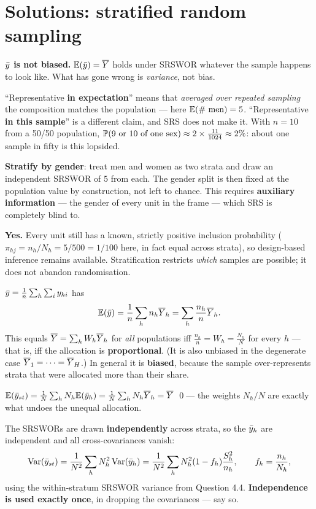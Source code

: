 \section{Solutions: stratified random sampling}
\setcounter{qq}{0}

 \textbf{$\bar{y}$ is not biased.} $\mathbb{E}(\bar{y})=\overline{Y}$ holds under SRSWOR whatever the sample
happens to look like. What has gone wrong is \emph{variance}, not bias.

``Representative \textbf{in expectation}'' means that \emph{averaged over repeated sampling} the
composition matches the population --- here $\mathbb{E}(\text{\# men})=5$. ``Representative \textbf{in
this sample}'' is a different claim, and SRS does not make it. With $n=10$ from a 50/50
population, $\mathbb{P}(\text{9 or 10 of one sex})\approx2\times\frac{11}{1024}\approx2\%$: about one
sample in fifty is this lopsided.

 \textbf{Stratify by gender}: treat men and women as two strata and draw an independent
SRSWOR of $5$ from each. The gender split is then fixed at the population value by construction,
not left to chance. This requires \textbf{auxiliary information} --- the gender of every unit in
the frame --- which SRS is completely blind to.

 \textbf{Yes.} Every unit still has a known, strictly positive inclusion probability
($\pi_{hj}=n_h/N_h=5/500=1/100$ here, in fact equal across strata), so design-based inference
remains available. Stratification restricts \emph{which} samples are possible; it does not
abandon randomisation.

 $\bar{y}=\frac1n\sum_h\sum_iy_{hi}$ has
\[
  \mathbb{E}(\bar{y})=\frac1n\sum_h n_h\overline{Y}_h=\sum_h\frac{n_h}{n}\overline{Y}_h .
\]
This equals $\overline{Y}=\sum_hW_h\overline{Y}_h$ for \emph{all} populations iff $\frac{n_h}{n}=W_h=\frac{N_h}{N}$
for every $h$ --- that is, iff the allocation is \textbf{proportional}. (It is also unbiased in
the degenerate case $\overline{Y}_1=\cdots=\overline{Y}_H$.) In general it is \textbf{biased}, because the
sample over-represents strata that were allocated more than their share.

 $\mathbb{E}(\bar{y}_{st})=\frac1N\sum_hN_h\mathbb{E}(\bar{y}_h)=\frac1N\sum_hN_h\overline{Y}_h=\overline{Y}$ \qed ---
the weights $N_h/N$ are exactly what undoes the unequal allocation.

 The SRSWORs are drawn \textbf{independently} across strata, so the $\bar{y}_h$ are
independent and all cross-covariances vanish:
\[
  \operatorname{Var}(\bar{y}_{st})=\frac1{N^2}\sum_hN_h^2\operatorname{Var}(\bar{y}_h)
  =\frac1{N^2}\sum_hN_h^2(1-f_h)\frac{S_h^2}{n_h},\qquad f_h=\frac{n_h}{N_h},
\]
using the within-stratum SRSWOR variance from Question 4.4. \textbf{Independence is used exactly
once}, in dropping the covariances --- say so.

